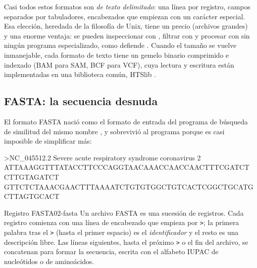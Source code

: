 Casi todos estos formatos son \emph{de texto delimitado}: una línea por registro, campos separados por tabuladores, encabezados que empiezan con un carácter especial. Esa elección, heredada de la filosofía de Unix, tiene un precio (archivos grandes) y una enorme ventaja: se pueden inspeccionar con , filtrar con  y procesar con  sin ningún programa especializado, como defiende \textcite{c02-buffalo2015}. Cuando el tamaño se vuelve inmanejable, cada formato de texto tiene un gemelo binario comprimido e indexado (BAM para SAM, BCF para VCF), cuya lectura y escritura están implementadas en una biblioteca común, HTSlib \parencite{c02-bonfield2021}.

\subsection{FASTA: la secuencia desnuda}

El formato FASTA nació como el formato de entrada del programa de búsqueda de similitud del mismo nombre \parencite{c02-lipman1985,c02-pearson1988}, y sobrevivió al programa porque es casi imposible de simplificar más:

\begin{consola}
>NC_045512.2 Severe acute respiratory syndrome coronavirus 2
ATTAAAGGTTTATACCTTCCCAGGTAACAAACCAACCAACTTTCGATCTCTTGTAGATCT
GTTCTCTAAACGAACTTTAAAATCTGTGTGGCTGTCACTCGGCTGCATGCTTAGTGCACT
\end{consola}

\begin{definicion}{Registro FASTA}{02-fasta}
Un archivo FASTA es una sucesión de registros. Cada registro comienza con una línea de encabezado que empieza por \texttt{>}; la primera palabra tras el \texttt{>} (hasta el primer espacio) es el \emph{identificador} y el resto es una descripción libre. Las líneas siguientes, hasta el próximo \texttt{>} o el fin del archivo, se concatenan para formar la secuencia, escrita con el alfabeto IUPAC de nucleótidos o de aminoácidos.
\end{definicion}

